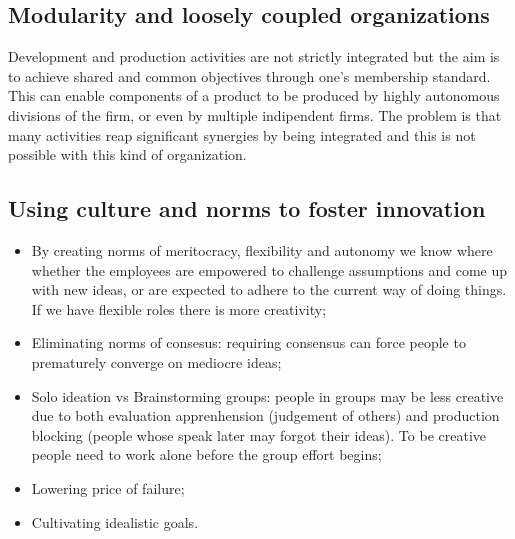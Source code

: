 \documentclass[12pt]{article}
\begin{document}
\subsection{Modularity and loosely coupled organizations}
Development and production activities are not strictly integrated but
the aim is to achieve shared and common objectives through one's membership
standard. This can enable components of a product to be produced by highly autonomous divisions of the firm, or even by multiple indipendent firms.
The problem is that many activities reap significant synergies by being integrated and this is not possible with this kind of organization.

\subsection{Using culture and norms to foster innovation}
\begin{itemize}
    \item By creating norms of meritocracy, flexibility and autonomy we know where whether the employees are empowered to challenge assumptions and come up with new ideas, or are expected to adhere to the current way of doing things. 
    If we have flexible roles there is more creativity;
    \item Eliminating norms of consesus: requiring consensus can force people to prematurely converge on mediocre ideas;
    \item Solo ideation vs Brainstorming groups: people in groups may be less creative due to both evaluation apprenhension (judgement of others) and production blocking (people whose speak later may forgot their ideas).
    To be creative people need to work alone before the group effort begins;
    \item Lowering price of failure;
    \item Cultivating idealistic goals.     
\end{itemize}
\end{document}

